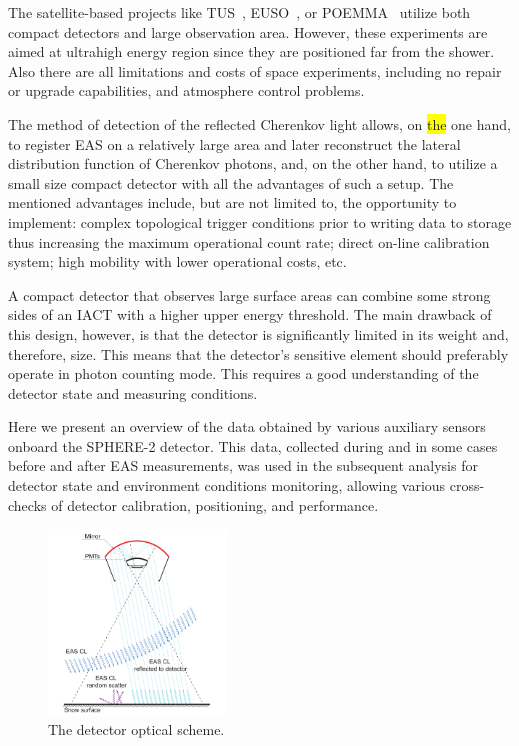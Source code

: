 \documentclass[universe,article,submit,moreauthors,pdftex]{Definitions/mdpi}
\newcommand{\highlight}[1]{\colorbox{yellow}{#1}}
\begin{document}
The satellite-based projects like TUS~\cite{TUS2017, TUS2020}, EUSO~\cite{EUSO2015, EUSO2021}, or  POEMMA~\cite{POEMMA2021} utilize both compact detectors and large observation area. However, these experiments are aimed at ultrahigh energy region since they are positioned far from the shower. Also there are all limitations and costs of space experiments, including no repair or upgrade capabilities, and atmosphere control problems.

The method of detection of the reflected Cherenkov light allows, on \highlight{the} one hand, to register EAS on a relatively large area and later reconstruct the lateral distribution function of Cherenkov photons, and, on the other hand, to utilize a small size compact detector with all the advantages of such a setup. The mentioned advantages include, but are not limited to, the opportunity to implement: complex topological trigger conditions prior to writing data to storage thus increasing the maximum operational count rate; direct on-line calibration system; high mobility with lower operational costs, etc.

A compact detector that observes large surface areas can combine some strong sides of an IACT with a higher upper energy threshold. The main drawback of this design, however, is that the detector is significantly limited in its weight and, therefore, size. This means that the detector's sensitive element should preferably operate in photon counting mode. This requires a good understanding of the detector state and measuring conditions.

Here we present an overview of the data obtained by various auxiliary sensors onboard the SPHERE-2 detector. This data, collected during and in some cases before and after EAS measurements, was used in the subsequent analysis for detector state and environment conditions monitoring, allowing various cross-checks of detector calibration, positioning, and performance.

\begin{figure}[bt]
\centering
    \includegraphics[width=0.42\textwidth]{optics}
    \caption{The detector optical scheme.}
\label{fig:optics}
\end{figure}
\end{document}
